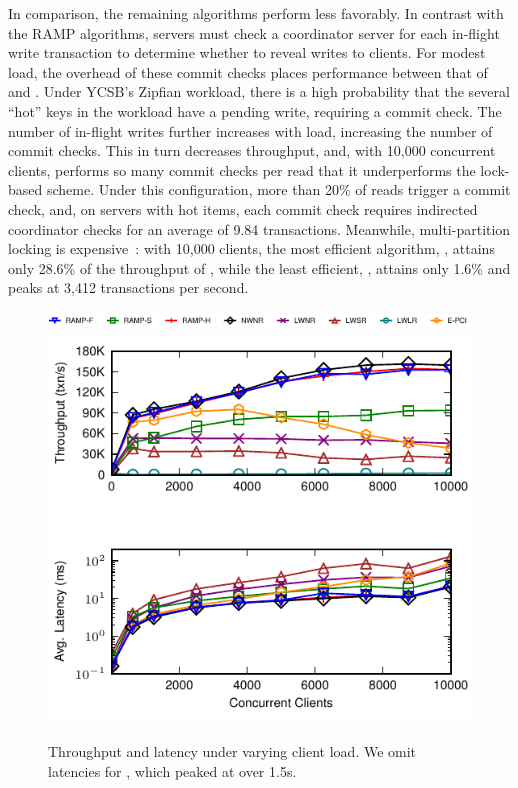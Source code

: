 In comparison, the remaining algorithms perform less favorably. In
contrast with the RAMP algorithms, \mstr servers must check a
coordinator server for each in-flight write transaction to determine
whether to reveal writes to clients. For modest load, the overhead of
these commit checks places \mstr performance between that of \raps and
\rapb.  Under YCSB's Zipfian workload, there is a high probability
that the several ``hot'' keys in the workload have a pending write,
requiring a \mstr commit check. The number of in-flight writes further
increases with load, increasing the number of \mstr commit
checks. This in turn decreases throughput, and, with 10,000 concurrent
clients, \mstr performs so many commit checks per read that it
underperforms the \lwnr lock-based scheme. Under this configuration,
more than 20\% of reads trigger a commit check, and, on servers with
hot items, each commit check requires indirected coordinator checks
for an average of 9.84 transactions. Meanwhile, multi-partition
locking is expensive~\cite{pavlo-partition}: with 10,000 clients, the
most efficient algorithm, \lwnr, attains only 28.6\% of the
throughput of \nwnr, while the least efficient, \lwlr, attains only
1.6\% and peaks at 3,412 transactions per second.


\begin{figure}[th!]
\begin{center}
{\includegraphics[width=\textwidth]{figs/legend-oneline.pdf}\vspace{0em}}
\includegraphics[width=.65\columnwidth]{figs/threads-thru.pdf}\vspace{-2em}
\includegraphics[width=.65\columnwidth]{figs/threads-lat.pdf}
\end{center}\vspace{-.5em}
\caption{Throughput and latency under varying client load. We omit
  latencies for \lwlr, which peaked at over 1.5s.}
\label{fig:clients}
\end{figure}


